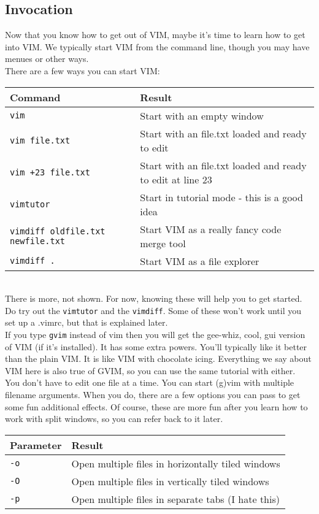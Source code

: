 \documentclass[a4paper, 12pt]{article}
\begin{document}
\subsection{Invocation}
\label{"Invocation"}
Now that you know how to get out of VIM, maybe it's time to learn how to get into VIM. We typically start VIM from the command line, though you may have menues or other ways.\\
There are a few ways you can start VIM:


\begin{tabular}{ l | p{8cm} }
  {\bf Command} & {\bf Result} \\ \hline
  {\tt vim} & Start with an empty window \\
  {\tt vim file.txt} & Start with an file.txt loaded and ready to edit \\
  {\tt vim +23 file.txt} & Start with an file.txt loaded and ready to edit at line 23\\
  {\tt vimtutor} & Start in tutorial mode - this is a good idea\\
  {\tt vimdiff oldfile.txt newfile.txt} & Start VIM as a really fancy code merge tool\\
  {\tt vimdiff .} & Start VIM as a file explorer\\ \hline
\end{tabular}\\

There is more, not shown. For now, knowing these will help you to get started. Do try out the {\tt vimtutor} and the {\tt vimdiff}. Some of these won't work until you set up a .vimrc, but that is explained later.\\
If you type {\tt gvim} instead of vim then you will get the gee-whiz, cool, gui version of VIM (if it's installed). It has some extra powers. You'll typically like it better than the plain VIM. It is like VIM with chocolate icing. Everything we say about VIM here is also true of GVIM, so you can use the same tutorial with either.\\
You don't have to edit one file at a time. You can start (g)vim with multiple filename arguments. When you do, there are a few options you can pass to get some fun additional effects. Of course, these are more fun after you learn how to work with split windows, so you can refer back to it later.


\begin{tabular}{ l | p{8cm} }
  {\bf Parameter} & {\bf Result} \\ \hline
  {\tt -o} & Open multiple files in horizontally tiled windows\\
  {\tt -O} & Open multiple files in vertically tiled windows\\
  {\tt -p} & Open multiple files in separate tabs (I hate this)\\ \hline
\end{tabular}\\
\end{document}
